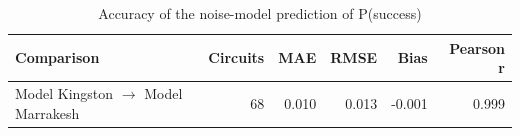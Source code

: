 \begin{table}[t]
\centering
\small
\caption{Accuracy of the noise-model prediction of P(success)}
\label{tab:model}
\begin{tabular}{lrrrrr}
\toprule
Comparison & Circuits & MAE & RMSE & Bias & Pearson r \\
\midrule
Model Kingston $\to$ Model Marrakesh & 68 & 0.010 & 0.013 & -0.001 & 0.999 \\
\bottomrule
\end{tabular}
\end{table}
